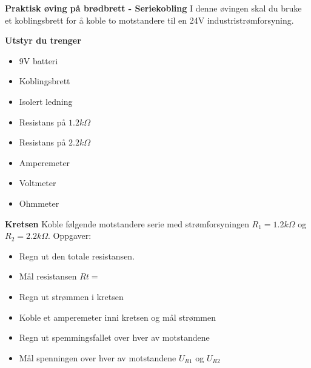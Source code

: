 

\large \textbf{Praktisk øving på brødbrett - Seriekobling }
\normalsize 
\vskip 10pt 
I denne øvingen skal du bruke et koblingsbrett for å koble to motstandere til en 24V industristrømforsyning.

\vskip 10pt 
\large \textbf{Utstyr du trenger}

\vskip 10pt 
\begin{itemize}[noitemsep]

\item 9V batteri
\item Koblingsbrett
\item Isolert ledning
\item Resistans på $1.2k\Omega$
\item Resistans på $2.2k\Omega$
\item Amperemeter
\item Voltmeter
\item Ohmmeter
\end{itemize}


\large \textbf{Kretsen}
\normalsize
\vskip 10pt 
Koble følgende motstandere serie med strømforsyningen $R_{1}=1.2k\Omega$ og $R_{2}=2.2k\Omega$.
Oppgaver:
\begin{itemize}[noitemsep]
	\item Regn ut den totale resistansen.
	\item Mål resistansen $R{t}=$
	\item Regn ut strømmen i kretsen 
	\item Koble et amperemeter inni kretsen og mål strømmen
	\item Regn ut spemmingsfallet over hver av motstandene
	\item Mål spenningen over hver av motstandene $U_{R1}$ og $U_{R2}$
\end{itemize}




















